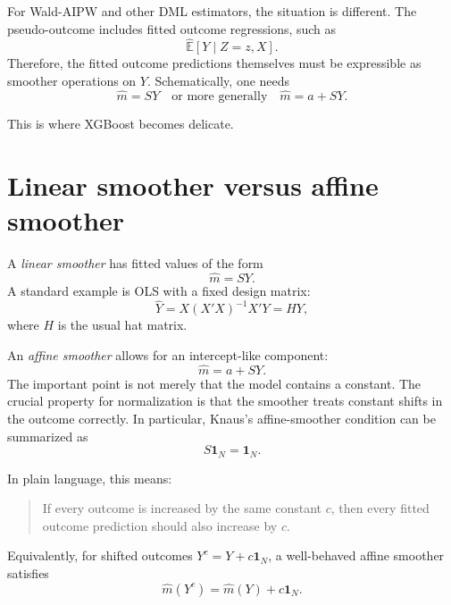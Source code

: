 \documentclass[11pt,a4paper]{article}
\begin{document}
For Wald-AIPW and other DML estimators, the situation is different. The
pseudo-outcome includes fitted outcome regressions, such as
\begin{equation}
    \widehat{\mathbb E}[Y\mid Z=z,X].
\end{equation}
Therefore, the fitted outcome predictions themselves must be expressible as
smoother operations on \(Y\). Schematically, one needs
\begin{equation}
    \hat m = SY
    \quad\text{or more generally}\quad
    \hat m = a + SY .
    \label{eq:smoother}
\end{equation}

This is where XGBoost becomes delicate.

\section{Linear smoother versus affine smoother}

A \emph{linear smoother} has fitted values of the form
\begin{equation}
    \hat m = SY.
\end{equation}
A standard example is OLS with a fixed design matrix:
\begin{equation}
    \hat Y = X(X'X)^{-1}X'Y = HY,
\end{equation}
where \(H\) is the usual hat matrix.

An \emph{affine smoother} allows for an intercept-like component:
\begin{equation}
    \hat m = a + SY.
\end{equation}
The important point is not merely that the model contains a constant. The crucial
property for normalization is that the smoother treats constant shifts in the
outcome correctly. In particular, Knaus's affine-smoother condition can be
summarized as
\begin{equation}
    S\mathbf{1}_N = \mathbf{1}_N.
    \label{eq:affine_condition}
\end{equation}

In plain language, this means:

\begin{quote}
If every outcome is increased by the same constant \(c\), then every fitted
outcome prediction should also increase by \(c\).
\end{quote}

Equivalently, for shifted outcomes \(Y^c = Y+c\mathbf{1}_N\), a well-behaved
affine smoother satisfies
\begin{equation}
    \hat m(Y^c) = \hat m(Y) + c\mathbf{1}_N.
\end{equation}
\end{document}
